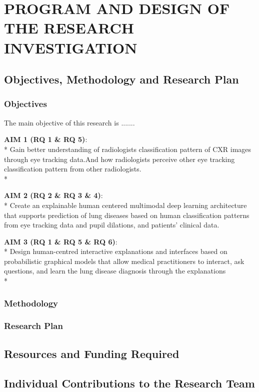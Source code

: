\section{PROGRAM AND DESIGN OF THE RESEARCH INVESTIGATION}
\label{sec:research-design}

\subsection{Objectives, Methodology and Research Plan}

\subsubsection{Objectives}
The main objective of this research is .......


\textbf{AIM 1 (RQ 1 \& RQ 5)}:\\*
Gain better understanding of radiologists classification pattern of CXR images through eye tracking data.And how radiologists perceive other eye tracking classification pattern from other radiologists. \\* 

\noindent
\textbf{AIM 2 (RQ 2 \& RQ 3 \& 4)}:\\*
 Create an explainable human centered multimodal deep learning architecture that supports prediction of lung diseases based on human classification patterns from eye tracking data and pupil dilations, and patients' clinical data.
\noindent


\textbf{AIM 3 (RQ 1 \& RQ 5 \& RQ 6)}:\\*
Design human-centred interactive explanations and interfaces based on probabilistic graphical models that allow medical practitioners to interact, ask questions, and learn the lung disease diagnosis through the explanations \\*


\subsubsection{Methodology}

\subsubsection{Research Plan}


\subsection{Resources and Funding Required}



\subsection{Individual Contributions to the Research Team}

